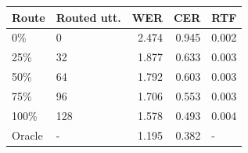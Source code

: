 \begin{tabular}{llrrl}
\toprule
Route & Routed utt. & WER & CER & RTF \\
\midrule
0\% & 0 & 2.474 & 0.945 & 0.002 \\
25\% & 32 & 1.877 & 0.633 & 0.003 \\
50\% & 64 & 1.792 & 0.603 & 0.003 \\
75\% & 96 & 1.706 & 0.553 & 0.003 \\
100\% & 128 & 1.578 & 0.493 & 0.004 \\
Oracle & - & 1.195 & 0.382 & - \\
\bottomrule
\end{tabular}
